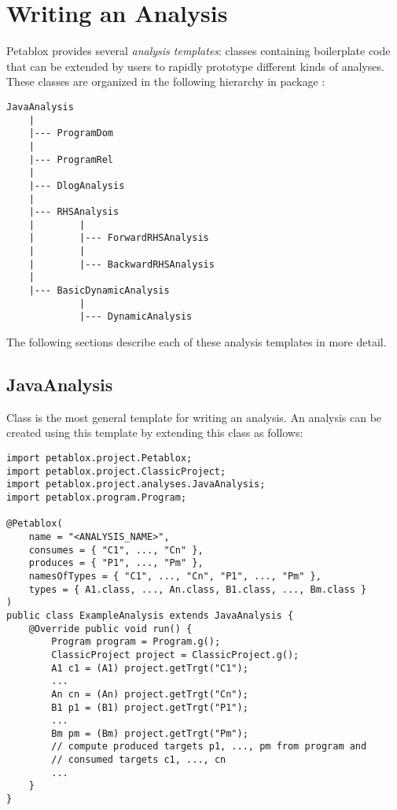 \chapter{Writing an Analysis}
\label{chap:writing}

Petablox provides several {\it analysis templates}: classes containing boilerplate
code that can be extended by users to rapidly prototype different kinds of
analyses.  These classes are organized in the following hierarchy in package
:

\begin{verbatim}
JavaAnalysis
    |
    |--- ProgramDom
    |
    |--- ProgramRel
    |
    |--- DlogAnalysis
    |
    |--- RHSAnalysis
    |        |
    |        |--- ForwardRHSAnalysis
    |        |
    |        |--- BackwardRHSAnalysis
    |
    |--- BasicDynamicAnalysis
             |
             |--- DynamicAnalysis
\end{verbatim}

The following sections describe each of these analysis templates in more detail.

\section{JavaAnalysis}
\label{sec:java}

Class 
is the most general template for writing an analysis.  An analysis can be
created using this template by extending this class as follows:

\begin{framed}
\begin{verbatim}
import petablox.project.Petablox;
import petablox.project.ClassicProject;
import petablox.project.analyses.JavaAnalysis;
import petablox.program.Program;

@Petablox(
    name = "<ANALYSIS_NAME>",
    consumes = { "C1", ..., "Cn" },
    produces = { "P1", ..., "Pm" },
    namesOfTypes = { "C1", ..., "Cn", "P1", ..., "Pm" },
    types = { A1.class, ..., An.class, B1.class, ..., Bm.class }
)
public class ExampleAnalysis extends JavaAnalysis {
    @Override public void run() {
        Program program = Program.g();
        ClassicProject project = ClassicProject.g();
        A1 c1 = (A1) project.getTrgt("C1");
        ...
        An cn = (An) project.getTrgt("Cn");
        B1 p1 = (B1) project.getTrgt("P1");
        ...
        Bm pm = (Bm) project.getTrgt("Pm");
        // compute produced targets p1, ..., pm from program and
        // consumed targets c1, ..., cn
        ...
    }
}
\end{verbatim}
\end{framed}

